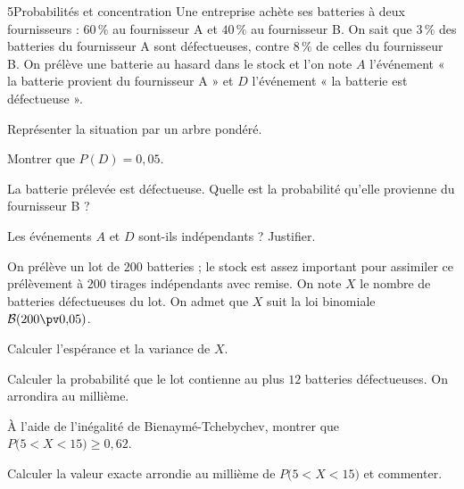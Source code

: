 

\begin{exoBac}{5}{Probabilités et concentration}
Une entreprise achète ses batteries à deux fournisseurs : $60\,\%$ au fournisseur A et $40\,\%$ au fournisseur B. On sait que $3\,\%$
des batteries du fournisseur A sont défectueuses, contre $8\,\%$ de celles du fournisseur B. On prélève une batterie au hasard dans le
stock et l'on note $A$ l'événement « la batterie provient du fournisseur A » et $D$ l'événement « la batterie est défectueuse ».
\begin{questions}
  \item Représenter la situation par un arbre pondéré.
  \item Montrer que $P(D)=0{,}05$.
  \item La batterie prélevée est défectueuse. Quelle est la probabilité qu'elle provienne du fournisseur B ?
  \item Les événements $A$ et $D$ sont-ils indépendants ? Justifier.
\end{questions}
On prélève un lot de $200$ batteries ; le stock est assez important pour assimiler ce prélèvement à $200$ tirages indépendants avec
remise. On note $X$ le nombre de batteries défectueuses du lot. On admet que $X$ suit la loi binomiale $\mathcal{B}(200\pv0{,}05)$.
\begin{questions}[resume]
  \item Calculer l'espérance et la variance de $X$.
  \item Calculer la probabilité que le lot contienne au plus $12$ batteries défectueuses. On arrondira au millième.
  \item À l'aide de l'inégalité de Bienaymé-Tchebychev, montrer que $P\big(5<X<15\big)\geq0{,}62$.
  \item Calculer la valeur exacte arrondie au millième de $P\big(5<X<15\big)$ et commenter.
\end{questions}
\end{exoBac}

